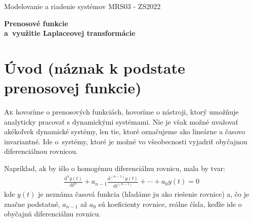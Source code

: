 \documentclass[a4paper, 10pt, ]{article}
\def\oznacenieCasti{MRS03 - ZS2022}
\begin{document}
\lstset{%
style=mystyle,
rangebeginprefix=\#\#\#\ cellB\ ,%
rangebeginsuffix=\ \#\#\#,%
rangeendprefix=\#\#\#\ cellE\ ,%
rangeendsuffix=\ \#\#\#,%
includerangemarker=false,
}




\fontsize{12pt}{22pt}\selectfont

\centerline{\textsf{Modelovanie a riadenie systémov} \hfill \textsf{\oznacenieCasti}}

\fontsize{18pt}{22pt}\selectfont





\begin{flushleft}
	\textbf{\textsf{Prenosové funkcie\\a~využitie Laplaceovej transformácie}}
\end{flushleft}





\normalsize

\bigskip

{\hypersetup{hidelinks}

\tableofcontents

}

\bigskip

\vspace{18pt}








\section{Úvod {\color{Gray} \normalsize (náznak k podstate prenosovej funkcie)}}
\label{predchcasttato}


\lettrine[lines=3, nindent=0pt]{A}{k} hovoríme o prenosových funkciách, hovoríme o nástroji, ktorý umožňuje analyticky pracovať s dynamickými systémami. Nie je však možné uvažovať akékoľvek dynamické systémy, len tie, ktoré označujeme ako lineárne a časovo invariantné. Ide o~systémy, ktoré je možné vo všeobecnosti vyjadriť obyčajnou diferenciálnou rovnicou.

Napríklad, ak by išlo o homogénnu diferenciálnu rovnicu, mala by tvar:
\begin{align} \label{vseobDifRov_h}
	\frac{\text{d}^n y(t)}{\text{d}t^n} + a_{n-1} \frac{\text{d}^{(n-1)} y(t)}{\text{d}t^{(n-1)}} + \cdots + a_0 y(t) = 0
\end{align}
kde $y(t)$ je neznáma časová funkcia (hľadáme ju ako riešenie rovnice) a, čo je značne podstatné, $a_{n-1}$ až $a_0$ sú koeficienty rovnice, reálne čísla, keďže ide o obyčajnú diferenciálnu rovnicu.
\end{document}
